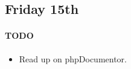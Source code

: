 \subsection{Friday 15th}
\paragraph{TODO}
\begin{itemize}
\item Read up on phpDocumentor.
\end{itemize}

